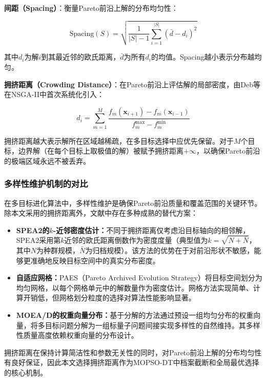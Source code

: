 \textbf{间距（Spacing）}：衡量Pareto前沿上解的分布均匀性：

\begin{equation}
\text{Spacing}(S) = \sqrt{\frac{1}{|S|-1} \sum_{i=1}^{|S|} (\bar{d} - d_i)^2}
\label{eq:spacing}
\end{equation}

其中$d_i$为解$i$到其最近邻的欧氏距离，$\bar{d}$为所有$d_i$的均值。Spacing越小表示分布越均匀。

\textbf{拥挤距离（Crowding Distance）}：在Pareto前沿上评估解的局部密度，由Deb等在NSGA-II\cite{Deb2002}中首次系统化引入：

\begin{equation}
d_i = \sum_{m=1}^{M} \frac{f_m(\mathbf{x}_{i+1}) - f_m(\mathbf{x}_{i-1})}{f_m^{\max} - f_m^{\min}}
\label{eq:crowding}
\end{equation}

拥挤距离越大表示解所在区域越稀疏，在多目标选择中应优先保留。对于$M$个目标，边界解（在每个目标上取极值的解）被赋予拥挤距离$+\infty$，以确保Pareto前沿的极端区域永远不被丢弃。

\subsubsection{多样性维护机制的对比}

在多目标进化算法中，多样性维护是确保Pareto前沿质量和覆盖范围的关键环节。除本文采用的拥挤距离外，文献中存在多种成熟的替代方案：

\begin{itemize}
    \item \textbf{SPEA2的$k$-近邻密度估计\cite{Zitzler2001}：}不同于拥挤距离仅考虑沿目标轴向的相邻解，SPEA2采用第$k$近邻的欧氏距离倒数作为密度度量（典型值为$k = \sqrt{N + \bar{N}}$，其中$N$为种群规模，$\bar{N}$为归档规模）。该方法的优势在于对前沿形状不敏感，能够更准确地反映目标空间中的真实分布密度。
    \item \textbf{自适应网格\cite{Knowles2000}：}PAES（Pareto Archived Evolution Strategy）将目标空间划分为均匀网格，以每个网格单元中的解数量作为密度估计。网格方法实现简单、计算开销低，但网格划分粒度的选择对算法性能影响显著。
    \item \textbf{MOEA/D的权重向量分布\cite{Zhang2007}：}基于分解的方法通过预设一组均匀分布的权重向量，将多目标问题分解为一组标量子问题间接实现多样性的自然维持。其多样性质量高度依赖权重向量的分布设计。
\end{itemize}

拥挤距离在保持计算简洁性和参数无关性的同时，对Pareto前沿上解的分布均匀性有良好保证，因此本文选择拥挤距离作为MOPSO-DT中档案截断和全局最优选择的核心机制。

